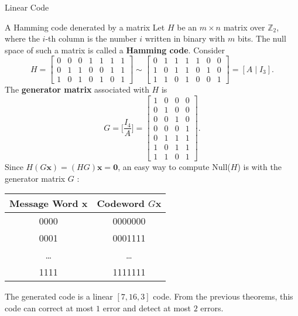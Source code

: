 \documentclass[final]{beamer}
\newcommand{\Z}{\mathbb{Z}}
\newlength{\colwidth}
\begin{document}
\begin{frame}[t]
\begin{columns}[t]
\begin{column}{\colwidth}
\begin{block}{Linear Code}
    \begin{exampleblock}{A Hamming code denerated by a matrix}
      Let $H$ be an $m \times n$ matrix over $\Z_2$, where the $i$-th column is the number $i$ written in binary with $m$ bits. The null space of such a matrix is called a \textbf{Hamming code}. Consider $$H = \begin{bmatrix}
        0 & 0 & 0 & 1 & 1 & 1 & 1 \\
        0 & 1 & 1 & 0 & 0 & 1 & 1 \\
        1 & 0 & 1 & 0 & 1 & 0 & 1
      \end{bmatrix} \sim \begin{bmatrix}
        0 & 1 & 1 & 1 & 1 & 0 & 0 \\
        1 & 0 & 1 & 1 & 0 & 1 & 0 \\
        1 & 1 & 0 & 1 & 0 & 0 & 1
      \end{bmatrix} = [A \mid I_3].$$ The \textbf{generator matrix} associated with $H$ is $$G = \bigg[ \dfrac{I_4}{A} \bigg] = \begin{bmatrix}
        1 & 0 & 0 & 0 \\
        0 & 1 & 0 & 0 \\
        0 & 0 & 1 & 0 \\
        0 & 0 & 0 & 1 \\
        0 & 1 & 1 & 1 \\
        1 & 0 & 1 & 1 \\
        1 & 1 & 0 & 1
      \end{bmatrix}.$$
      Since $H(G\textbf{x}) = (HG)\textbf{x} = \textbf{0}$, an easy way to compute Null($H$) is with the generator matrix $G$ :

      \vspace{2mm}

      \begin{table}[h!]
        \centering
        \begin{tabular}{cc}
          \hline
          Message Word \textbf{x} & Codeword $G\textbf{x}$ \\
          \hline
          0000 & 0000000 \\
          0001 & 0001111 \\
          \dots & \dots \\
          1111 & 1111111 \\
          \hline
        \end{tabular}
      \end{table}

      The generated code is a linear $[7, 16, 3]$ code. From the previous theorems, this code can correct at most $1$ error and detect at most $2$ errors. 
    \end{exampleblock}


\end{block}
\end{column}
\end{columns}
\end{frame}
\end{document}

